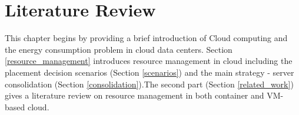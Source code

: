 \chapter{Literature Review}\label{C:background}
This chapter begins by providing a brief introduction of Cloud computing and the energy consumption problem in cloud data centers. Section \ref{resource_management} introduces resource management in cloud including the placement decision scenarios (Section \ref{scenarios}) and the main strategy - server consolidation (Section \ref{consolidation}).The second part (Section \ref{related_work}) gives a literature review on resource management in both container and VM-based cloud. 




% 
% 
% 













